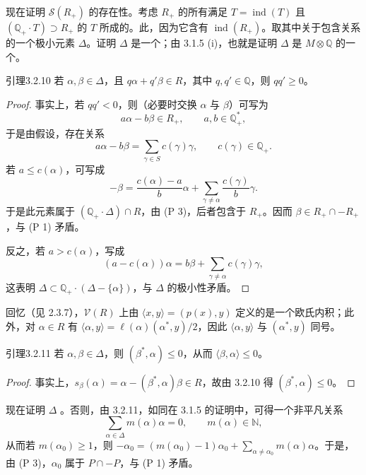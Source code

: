 现在证明 $\mathscr S(R_+)$ 的存在性。考虑 $R_+$ 的所有满足 $T=\operatorname{ind}(T)$ 且 $(\mathbb Q_+\cdot T)\supset R_+$ 的 $T$ 所成的。此，因为它含有 $\operatorname{ind}(R_+)$。取其中关于包含关系的一个极小元素 $\Delta$。证明 $\Delta$ 是一个；由 3.1.5 (i)，也就是证明 $\Delta$ 是 $M\otimes\mathbb Q$ 的一个。
\begin{SGAresult}{引理}{3.2.10}
若 $\alpha,\beta\in\Delta$，且 $q\alpha+q'\beta\in R$，其中 $q,q'\in\mathbb Q$，则 $qq'\geq0$。
\end{SGAresult}
\begin{proof}
事实上，若 $qq'<0$，则（必要时交换 $\alpha$ 与 $\beta$）可写为
\[a\alpha-b\beta\in R_+,\qquad a,b\in\mathbb Q_+^*,\]
于是由假设，存在关系
\[a\alpha-b\beta=\sum_{\gamma\in S}c(\gamma)\gamma,\qquad c(\gamma)\in\mathbb Q_+.\]
若 $a\leq c(\alpha)$，可写成
\[-\beta=\frac{c(\alpha)-a}{b}\alpha+\sum_{\gamma\ne\alpha}\frac{c(\gamma)}b\gamma.\]
于是此元素属于 $(\mathbb Q_+\cdot\Delta)\cap R$，由 (P 3)，后者包含于 $R_+$。因而 $\beta\in R_+\cap-R_+$，与 (P 1) 矛盾。

反之，若 $a>c(\alpha)$，写成
\[(a-c(\alpha))\alpha=b\beta+\sum_{\gamma\ne\alpha}c(\gamma)\gamma,\]
这表明 $\Delta\subset\mathbb Q_+\cdot(\Delta-\{\alpha\})$，与 $\Delta$ 的极小性矛盾。
\end{proof}
回忆（见 2.3.7），$\mathscr V(R)$ 上由 $\langle x,y\rangle=(p(x),y)$ 定义的是一个欧氏内积；此外，对 $\alpha\in R$ 有 $\langle\alpha,y\rangle=\ell(\alpha)(\alpha^*,y)/2$，因此 $\langle\alpha,y\rangle$ 与 $(\alpha^*,y)$ 同号。
\begin{SGAresult}{引理}{3.2.11}
若 $\alpha,\beta\in\Delta$，则 $(\beta^*,\alpha)\leq0$，从而 $\langle\beta,\alpha\rangle\leq0$。
\end{SGAresult}
\begin{proof}
事实上，$s_\beta(\alpha)=\alpha-(\beta^*,\alpha)\beta\in R$，故由 3.2.10 得 $(\beta^*,\alpha)\leq0$。
\end{proof}
现在证明 $\Delta$ 。否则，由 3.2.11，如同在 3.1.5 的证明中，可得一个非平凡关系
\[\sum_{\alpha\in\Delta}m(\alpha)\alpha=0,\qquad m(\alpha)\in\mathbb N,\]
从而若 $m(\alpha_0)\geq1$，则 $-\alpha_0=(m(\alpha_0)-1)\alpha_0+\sum_{\alpha\ne\alpha_0}m(\alpha)\alpha$。于是，由 (P 3)，$\alpha_0$ 属于 $P\cap-P$，与 (P 1) 矛盾。

